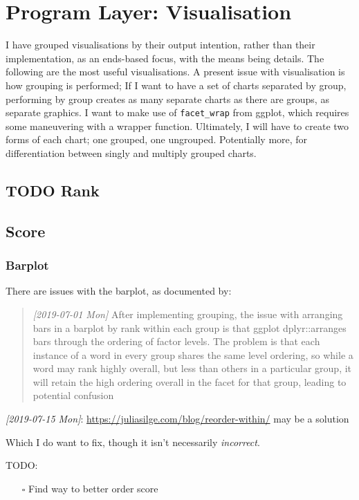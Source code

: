 \documentclass[a4paper, 11pt]{article}
\begin{document}
\section{Program Layer: Visualisation}
\label{sec:org612636d}
I have grouped visualisations by their output intention, rather than
their implementation, as an ends-based focus, with the means being
details. The following are the most useful visualisations. A present
issue with visualisation is how grouping is performed; If I want to
have a set of charts separated by group, performing by group creates
as many separate charts as there are groups, as separate graphics. I
want to make use of \texttt{facet\_wrap} from ggplot, which requires some
maneuvering with a wrapper function. Ultimately, I will have to create
two forms of each chart; one grouped, one ungrouped. Potentially more,
for differentiation between singly and multiply grouped charts.
\subsection{{\bfseries\sffamily TODO} Rank}
\label{sec:org2e5b4c6}
\subsection{Score}
\label{sec:org91c7e11}
\subsubsection{Barplot}
\label{sec:org6480b26}
There are issues with the barplot, as documented by:
\begin{quote}
\textit{[2019-07-01 Mon] } After implementing grouping, the issue with arranging
bars in a barplot by rank within each group is that ggplot dplyr::arranges
bars through the ordering of factor levels. The problem is that each
instance of a word in every group shares the same level ordering, so
while a word may rank highly overall, but less than others in a
particular group, it will retain the high ordering overall in the
facet for that group, leading to potential confusion
\end{quote}

\textit{[2019-07-15 Mon]}: \url{https://juliasilge.com/blog/reorder-within/} may be a solution

Which I do want to fix, though it isn't necessarily \emph{incorrect}.

TODO:
\begin{itemize}
\item[{$\square$}] Find way to better order score
\end{itemize}
\end{document}

